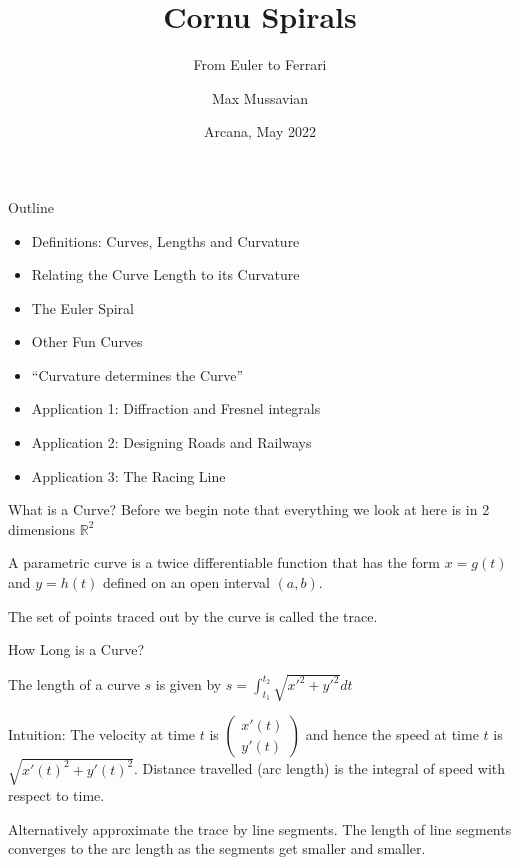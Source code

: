 \documentclass{beamer}
\title{Cornu Spirals}
\subtitle{From Euler to Ferrari}
\author{Max Mussavian}
\date[2022]{Arcana, May 2022}
\begin{document}
\begin{frame}[plain]
    \maketitle
\end{frame}
\begin{frame}{Outline}
	\begin{itemize}
		\item Definitions: Curves, Lengths and Curvature
		\item Relating the Curve Length to its Curvature
		\item The Euler Spiral
		\item Other Fun Curves
		\item ``Curvature determines the Curve''
		\item Application 1: Diffraction and Fresnel integrals
		\item Application 2: Designing Roads and Railways
		\item Application 3: The Racing Line
	\end{itemize}
\end{frame}

\begin{frame}{What is a Curve?}
	Before we begin note that everything we look at here is in 2 dimensions $\mathbb{R}^2$
	\begin{definition}
		A parametric curve is a twice differentiable function that has the form
		$x = g(t)$ and $y=h(t)$ defined on an open interval $(a, b)$.
		
		The set of points traced out by the curve is called the trace.
	\end{definition}
\end{frame}

\begin{frame}{How Long is a Curve?}
	\begin{definition}
		The length of a curve $s$ is given by
		$s = \int_{t_1}^{t_2} \sqrt{x'^2+y'^2}dt$
	\end{definition}
	Intuition: The velocity at time $t$ is $\left( \begin{array}{c}
		x'(t)\\
		y'(t)
	\end{array} \right)$ and hence the speed at time $t$ is $\sqrt{x'(t)^2+y'(t)^2}$. Distance travelled (arc length) is the integral of speed with respect to time. 

	Alternatively approximate the trace by line segments. The length of line segments converges to the arc length as the segments get smaller and smaller.
\end{frame}
\end{document}
